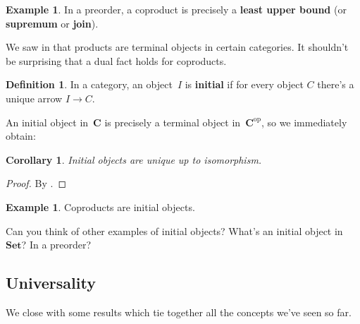 \documentclass[letterpaper,12pt]{article}
\newcommand{\cat}[1]{\mathbf{#1}}
\newcommand{\dual}[1]{#1^{\mathrm{op}}}
\newcommand{\Set}{\cat{Set}}
\newcommand{\textdefn}{\textbf}
\theoremstyle{definition}
\newtheorem{defn}[equation]{Definition}
\newtheorem{exmp}[equation]{Example}
\theoremstyle{plain}
\newtheorem{cor}[equation]{Corollary}
\numberwithin{equation}{section}
\begin{document}
\begin{exmp}
In a preorder, a coproduct is precisely a \textdefn{least upper bound} (or \textdefn{supremum} or \textdefn{join}).
\end{exmp}

\noindent We saw in  that products are terminal objects in certain categories. It shouldn't be surprising that a dual fact holds for coproducts.
\begin{defn}
In a category, an object~\(I\) is \textdefn{initial} if for every object \(C\) there's a unique arrow \(I\to C\).
\end{defn}

\noindent An initial object in~\(\cat{C}\) is precisely a terminal object in~\(\dual{\cat{C}}\), so we immediately obtain:
\begin{cor}
Initial objects are unique up to isomorphism.
\end{cor}
\begin{proof}
By .
\end{proof}

\begin{exmp}
Coproducts are initial objects.
\end{exmp}

\noindent Can you think of other examples of initial objects? What's an initial object in~\(\Set\)? In a preorder?

\subsection{Universality}
We close with some results which tie together all the concepts we've seen so far.
\end{document}
